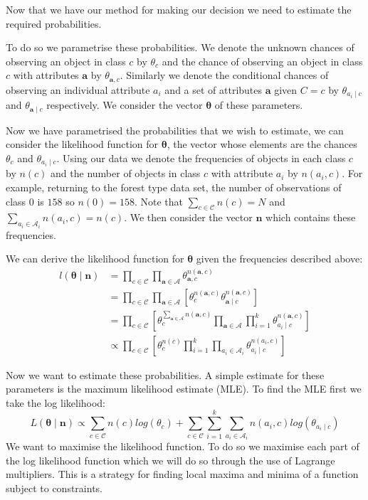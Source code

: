 Now that we have our method for making our decision we need to estimate the required probabilities.

To do so we parametrise these probabilities.
We denote the unknown chances of observing an object in class $c$ by $\theta_c$ and the chance of observing an object in class $c$ with attributes $\mathbf{a}$ by $\theta_{\mathbf{a}, c}$.
Similarly we denote the conditional chances of observing an individual attribute $a_i$ and a set of attributes $\mathbf{a}$ given $C=c$ by $\theta_{a_i \mid c}$ and $\theta_{\mathbf{a} \mid c}$ respectively.
We consider the vector $\bm{\theta}$ of these parameters.

Now we have parametrised the probabilities that we wish to estimate, we can consider the likelihood function for $\bm{\theta}$, the vector whose elements are the chances $\theta_{c}$ and $\theta_{a_i \mid c}$.
Using our data we denote the frequencies of objects in each class $c$ by $n(c)$ and the number of objects in class $c$ with attribute $a_i$ by $n(a_i, c)$.
For example, returning to the forest type data set, the number of observations of class $0$ is $158$ so $n(0) = 158$.
Note that $\sum_{c \in \mathcal{C}}n(c) = N$ and $\sum_{a_i \in \mathcal{A}_i}n(a_i, c) = n(c)$.
We then consider the vector $\mathbf{n}$ which contains these frequencies.

We can derive the likelihood function for $\mathbf{\theta}$ given the frequencies described above:
\begin{align} \label{likelihood}
	l(\bm{\theta} \mid \mathbf{n}) & =  \prod_{c \in \mathcal{C}} \prod_{\mathbf{a} \in \mathbf{\mathcal{A}}} \theta_{\mathbf{a}, c}^{n(\mathbf{a}, c)} \\
	& = \prod_{c \in \mathcal{C}} \prod_{\mathbf{a} \in \mathbf{\mathcal{A}}} \left[ \theta_{c}^{n(\mathbf{a}, c)} \theta_{\mathbf{a} \mid c}^{n(\mathbf{a}, c)} \right] \\
	& = \prod_{c \in \mathcal{C}} \left[ \theta_{c}^{\sum_{\mathbf{a} \in \mathbf{\mathcal{A}}} n(\mathbf{a}, c)} \prod_{\mathbf{a} \in \mathbf{\mathcal{A}}} \prod_{i=1}^k \theta_{a_i \mid c}^{n(\mathbf{a}, c)} \right] \\
	& \propto \prod_{c \in \mathcal{C}} \left[ \theta_c^{n(c)} \prod_{i=1}^k \prod_{a_i \in \mathcal{A}_i} \theta_{a_i \mid c}^{n(a_i, c)} \right]
\end{align}

Now we want to estimate these probabilities.
A simple estimate for these parameters is the maximum likelihood estimate (MLE).
To find the MLE first we take the log likelihood:
\begin{equation}
	L(\bm{\theta} \mid \mathbf{n}) \propto \sum_{c \in \mathcal{C}}  n(c)log(\theta_c) + \sum_{c \in \mathcal{C}} \sum_{i=1}^k \sum_{a_i \in \mathcal{A}_i} n(a_i, c) log(\theta_{a_i \mid c}) 
\end{equation}
We want to maximise the likelihood function.
To do so we maximise each part of the log likelihood function which we will do so through the use of Lagrange multipliers.
This is a strategy for finding local maxima and minima of a function subject to constraints.

